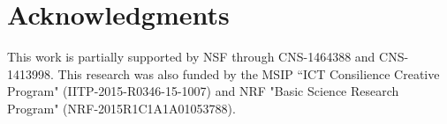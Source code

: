 \section*{Acknowledgments}
This work is partially supported by NSF through CNS-1464388 and CNS-1413998. This research was also funded by the MSIP ``ICT Consilience Creative Program" (IITP-2015-R0346-15-1007) and NRF "Basic Science Research Program" (NRF-2015R1C1A1A01053788).
